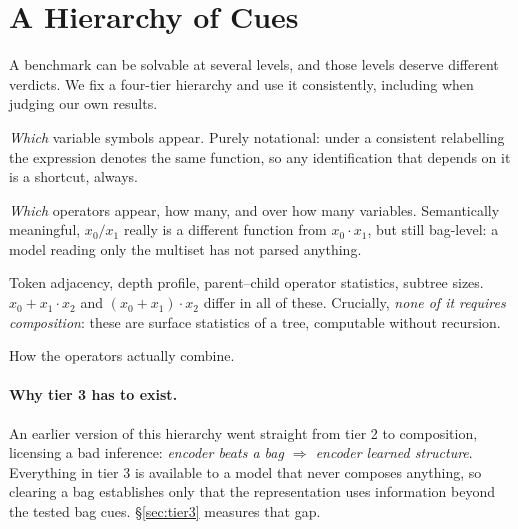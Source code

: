 \section{A Hierarchy of Cues}
\label{sec:tiers}

A benchmark can be solvable at several levels, and those levels deserve different verdicts. We fix
a four-tier hierarchy and use it consistently, including when judging our own results.

\begin{description}[noitemsep,topsep=2pt,leftmargin=1.2em]
  \item[Tier 1: variable identity.] \emph{Which} variable symbols appear. Purely notational:
    under a consistent relabelling the expression denotes the same function, so any identification
    that depends on it is a shortcut, always.
  \item[Tier 2: operator and arity inventory.] \emph{Which} operators appear, how many, and over
    how many variables. Semantically meaningful, $x_0/x_1$ really is a different function from
    $x_0 \cdot x_1$, but still bag-level: a model reading only the multiset has not parsed
    anything.
  \item[Tier 3: order, depth and local shape.] Token adjacency, depth profile, parent--child
    operator statistics, subtree sizes. $x_0 + x_1 \cdot x_2$ and $(x_0 + x_1) \cdot x_2$ differ in
    all of these. Crucially, \emph{none of it requires composition}: these are surface statistics of
    a tree, computable without recursion.
  \item[Tier 4: compositional structure.] How the operators actually combine.
\end{description}

\paragraph{Why tier 3 has to exist.} An earlier version of this hierarchy went straight from tier 2
to composition, licensing a bad inference: \emph{encoder beats a bag $\Rightarrow$ encoder learned
structure}. Everything in tier 3 is available to a model that never composes anything, so clearing a
bag establishes only that the representation uses information beyond the tested bag cues.
\S\ref{sec:tier3} measures that gap.

